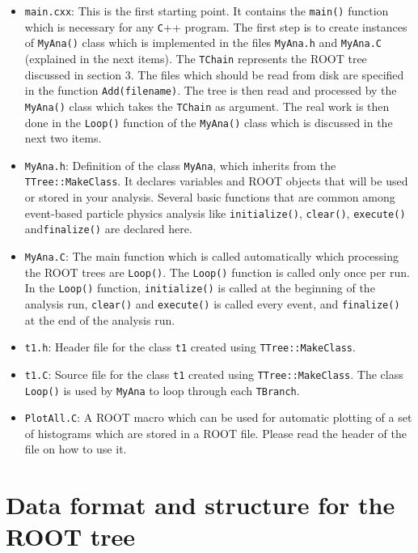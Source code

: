 \begin{itemize}
\item  \verb+main.cxx+: This is the first starting point. It contains the \verb+main()+ function which is necessary for any \verb+C+++ program. The first step is to create instances of \verb+MyAna()+ class which is implemented in the files \verb+MyAna.h+ and \verb+MyAna.C+ (explained in the next items). The \verb+TChain+ represents the ROOT tree discussed in section 3. The files which should be read from disk are specified in the function \verb+Add(filename)+. The tree is then read and processed by the \verb+MyAna()+ class which takes the \verb+TChain+ as argument. The real work is then done in the \verb+Loop()+ function of the \verb+MyAna()+ class which is discussed in the next two items. 

\item \verb+MyAna.h+: Definition of the class \verb+MyAna+, which inherits from the \verb+TTree::MakeClass+. It declares variables and ROOT objects that will be used or stored in your analysis. Several basic functions that are common among event-based particle physics analysis like \verb+initialize()+, \verb+clear()+, \verb+execute()+ and\verb+finalize()+ are declared here.
\item \verb+MyAna.C+: The main function which is called automatically which processing the ROOT trees are \verb+Loop()+. The \verb+Loop()+ function is called only once per run. In the \verb+Loop()+ function, \verb+initialize()+ is called at the beginning of the analysis run, \verb+clear()+ and \verb+execute()+ is called every event, and \verb+finalize()+ at the end of the analysis run.

\item \verb+t1.h+: Header file for the class \verb+t1+ created using \verb+TTree::MakeClass+.  

\item \verb+t1.C+: Source file for the class \verb+t1+ created using \verb+TTree::MakeClass+. The class \verb+Loop()+ is used by \verb+MyAna+ to loop through each \verb+TBranch+.

\item \verb+PlotAll.C+: A ROOT macro which can be used for automatic plotting of a set of histograms which are stored in a ROOT file. Please read the header of the file on how to use it. 
\end{itemize}

\section{Data format and structure for the ROOT tree}

